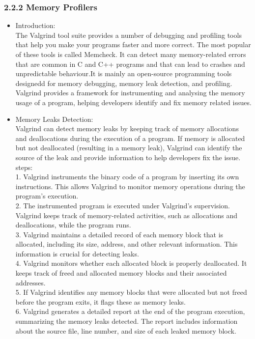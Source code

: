 \documentclass{article}
\begin{document}
\subsubsection*{\large 2.2.2 Memory Profilers}
\begin{itemize}
    \item Introduction:\\
    The Valgrind tool suite provides a number of debugging and profiling tools that help you make your programs faster and more correct. The most popular of these tools is called Memcheck. It can detect many memory-related errors that are common in C and C++ programs and that can lead to crashes and unpredictable behaviour.It is mainly an open-source programming tools designedd for memory debugging, memory leak detection, and profiling. Valgrind provides a framework for instrumenting and analysing the memory usage of a program, helping developers identify and fix memory related issues.
    \item Memory Leaks Detection:\\
    Valgrind can detect memory leaks by keeping track of memory allocations and deallocations during the execution of a program. If memory is allocated but not deallocated (resulting in a memory leak), Valgrind can identify the source of the leak and provide information to help developers fix the issue.\\
    steps:\\
     1. Valgrind instruments the binary code of a program by inserting its own instructions. This allows Valgrind to monitor memory operations during the program's execution.\\
     2. The instrumented program is executed under Valgrind's supervision. Valgrind keeps track of memory-related activities, such as allocations and deallocations, while the program runs.\\
     3. Valgrind maintains a detailed record of each memory block that is allocated, including its size, address, and other relevant information. This information is crucial for detecting leaks.\\
     4. Valgrind monitors whether each allocated block is properly deallocated. It keeps track of freed and allocated memory blocks and their associated addresses.\\
     5. If Valgrind identifies any memory blocks that were allocated but not freed before the program exits, it flags these as memory leaks.\\
     6. Valgrind generates a detailed report at the end of the program execution, summarizing the memory leaks detected. The report includes information about the source file, line number, and size of each leaked memory block.\\

\end{itemize}
\end{document}
